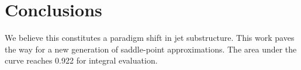 \section{Conclusions}\label{sec:conclusions}

We believe this constitutes a paradigm shift in jet substructure. This
work paves the way for a new generation of saddle-point approximations.
The area under the curve reaches 0.922 for integral evaluation.

